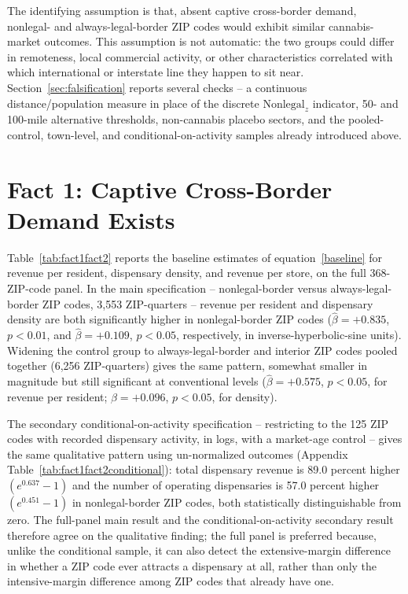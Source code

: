 \documentclass[english,12pt]{article}
\begin{document}
The identifying assumption is that, absent captive cross-border demand, nonlegal- and always-legal-border ZIP codes would exhibit similar cannabis-market outcomes. This assumption is not automatic: the two groups could differ in remoteness, local commercial activity, or other characteristics correlated with which international or interstate line they happen to sit near. Section~\ref{sec:falsification} reports several checks -- a continuous distance/population measure in place of the discrete $\text{Nonlegal}_z$ indicator, 50- and 100-mile alternative thresholds, non-cannabis placebo sectors, and the pooled-control, town-level, and conditional-on-activity samples already introduced above.

\section{Fact 1: Captive Cross-Border Demand Exists}
\label{sec:result1}

Table~\ref{tab:fact1fact2} reports the baseline estimates of equation~\eqref{baseline} for revenue per resident, dispensary density, and revenue per store, on the full 368-ZIP-code panel. In the main specification -- nonlegal-border versus always-legal-border ZIP codes, 3,553 ZIP-quarters -- revenue per resident and dispensary density are both significantly higher in nonlegal-border ZIP codes ($\hat\beta=+0.835$, $p<0.01$, and $\hat\beta=+0.109$, $p<0.05$, respectively, in inverse-hyperbolic-sine units). Widening the control group to always-legal-border and interior ZIP codes pooled together (6,256 ZIP-quarters) gives the same pattern, somewhat smaller in magnitude but still significant at conventional levels ($\hat\beta=+0.575$, $p<0.05$, for revenue per resident; $\hat\beta=+0.096$, $p<0.05$, for density).

The secondary conditional-on-activity specification -- restricting to the 125 ZIP codes with recorded dispensary activity, in logs, with a market-age control -- gives the same qualitative pattern using un-normalized outcomes (Appendix Table~\ref{tab:fact1fact2conditional}): total dispensary revenue is 89.0 percent higher $\left(e^{0.637}-1\right)$ and the number of operating dispensaries is 57.0 percent higher $\left(e^{0.451}-1\right)$ in nonlegal-border ZIP codes, both statistically distinguishable from zero. The full-panel main result and the conditional-on-activity secondary result therefore agree on the qualitative finding; the full panel is preferred because, unlike the conditional sample, it can also detect the extensive-margin difference in whether a ZIP code ever attracts a dispensary at all, rather than only the intensive-margin difference among ZIP codes that already have one.
\end{document}
